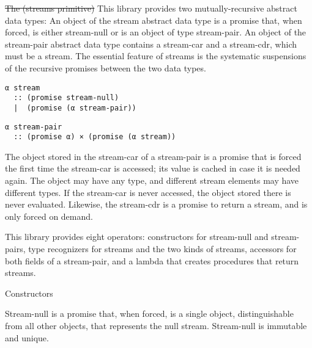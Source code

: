 

\st{The (streams primitive)} This library provides two mutually-recursive abstract
data types: An object of the stream abstract data type is a promise
that, when forced, is either stream-null or is an object of type
stream-pair. An object of the stream-pair abstract data type contains a
stream-car and a stream-cdr, which must be a stream. The essential
feature of streams is the systematic suspensions of the recursive
promises between the two data types.



\begin{verbatim}
α stream
  :: (promise stream-null)
  |  (promise (α stream-pair))
\end{verbatim}

\begin{verbatim}
α stream-pair
  :: (promise α) × (promise (α stream))
\end{verbatim}

The object stored in the stream-car of a stream-pair is a promise that
is forced the first time the stream-car is accessed; its value is cached
in case it is needed again. The object may have any type, and different
stream elements may have different types. If the stream-car is never
accessed, the object stored there is never evaluated. Likewise, the
stream-cdr is a promise to return a stream, and is only forced on
demand.

This library provides eight operators: constructors for stream-null and
stream-pairs, type recognizers for streams and the two kinds of streams,
accessors for both fields of a stream-pair, and a lambda that creates
procedures that return streams.

Constructors

\begin{entry}{%
  }

  Stream-null is a promise that, when forced, is a single object,
  distinguishable from all other objects, that represents the null
  stream.  Stream-null is immutable and unique.
\end{entry}

